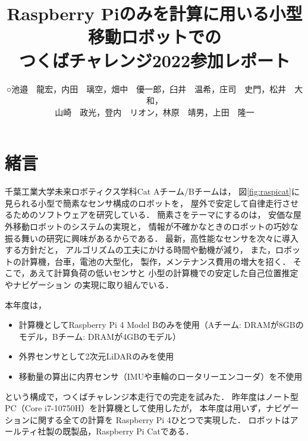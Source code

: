 \documentclass[twocolumn,9pt]{jsproceedings}
\title{Raspberry Piのみを計算に用いる小型移動ロボットでの\\つくばチャレンジ2022参加レポート}
\author{○池邉　龍宏\authorrefmark{1}，内田　璃空\authorrefmark{1}，畑中　優一郎\authorrefmark{1}，臼井　温希\authorrefmark{1}，庄司　史門\authorrefmark{1}，松井　大和\authorrefmark{1}，\\
山崎　政光\authorrefmark{1}，登内　リオン\authorrefmark{1}，林原　靖男\authorrefmark{1}，上田　隆一\authorrefmark{1}}
\affiliation{千葉工業大学 未来ロボティクス学科 Cat Aチーム/Bチーム}
\begin{document}
\maketitle



\section{緒言}

千葉工業大学未来ロボティクス学科Cat Aチーム/Bチームは，
図\ref{fig:raspicat}に見られる小型で簡素なセンサ構成のロボットを，
屋外で安定して自律走行させるためのソフトウェアを研究している．
簡素さをテーマにするのは，
安価な屋外移動ロボットのシステムの実現と，
情報が不確かなときのロボットの巧妙な振る舞いの研究に興味があるからである．
最新，高性能なセンサを次々に導入する方針だと，
アルゴリズムの工夫にかける時間や動機が減り，
また，ロボットの計算機，台車，電池の大型化，
製作，メンテナンス費用の増大を招く．
そこで，あえて計算負荷の低いセンサと
小型の計算機での安定した自己位置推定やナビゲーション
の実現に取り組んでいる．


本年度は，
\begin{itemize}
\item 計算機としてRaspberry Pi 4 Model Bのみを使用（Aチーム: DRAMが8GBのモデル，Bチーム: DRAMが4GBのモデル）
\item 外界センサとして2次元LiDARのみを使用
\item 移動量の算出に内界センサ（IMUや車輪のロータリーエンコーダ）を不使用
\end{itemize}
という構成で，つくばチャレンジ本走行での完走を試みた．
昨年度はノート型PC（Core i7-10750H）を計算機として使用したが，
本年度は用いず，ナビゲーションに関する全ての計算を
Raspberry Pi 4ひとつで実現した．
ロボットはアールティ社製の既製品，Raspberry Pi Catである．
\end{document}
